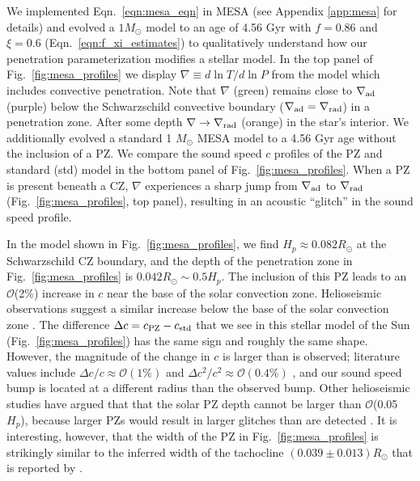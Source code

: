 \documentclass[twocolumn]{aastex631}
\newcommand{\gradrad}{\ensuremath{\nabla_{\rm{rad}}}}
\newcommand{\gradad}{\ensuremath{\nabla_{\rm{ad}}}}
\newcommand{\justgrad}{\ensuremath{\nabla}}
\begin{document}
We implemented Eqn.~\ref{eqn:mesa_eqn} in MESA (see Appendix \ref{app:mesa} for details) and evolved a $1 M_\odot$ model to an age of 4.56 Gyr with $f = 0.86$ and $\xi = 0.6$ (Eqn.~\ref{eqn:f_xi_estimates}) to qualitatively understand how our penetration parameterization modifies a stellar model.
In the top panel of Fig.~\ref{fig:mesa_profiles} we display $\justgrad \equiv d\ln T/d\ln P$ from the model which includes convective penetration.
Note that $\justgrad$ (green) remains close to $\gradad$ (purple) below the Schwarzschild convective boundary ($\gradad = \gradrad$) in a penetration zone.
After some depth $\justgrad \rightarrow \gradrad$ (orange) in the star's interior.
We additionally evolved a standard 1 $M_\odot$ MESA model to a 4.56 Gyr age without the inclusion of a PZ.
We compare the sound speed $c$ profiles of the PZ and standard (std) model in the bottom panel of Fig.~\ref{fig:mesa_profiles}.
When a PZ is present beneath a CZ, $\justgrad$ experiences a sharp jump from $\gradad$ to $\gradrad$ (Fig.~\ref{fig:mesa_profiles}, top panel), resulting in an acoustic ``glitch'' in the sound speed profile.

In the model shown in Fig.~\ref{fig:mesa_profiles}, we find $H_p \approx 0.082R_\odot$ at the Schwarzschild CZ boundary, and the depth of the penetration zone in Fig.~\ref{fig:mesa_profiles} is $0.042R_\odot \sim 0.5 H_p$.
The inclusion of this PZ leads to an $\mathcal{O}$(2\%) increase in $c$ near the base of the solar convection zone.
Helioseismic observations suggest a similar increase below the base of the solar convection zone \citep[e.g.,][their Fig. 17]{christensen-dalsgaard_etal_2011}.
The difference $\Delta c = c_{\rm{PZ}} - c_{\rm{std}}$ that we see in this stellar model of the Sun (Fig.~\ref{fig:mesa_profiles}) has the same sign and roughly the same shape.
However, the magnitude of the change in $c$ is larger than is observed; literature values include $\Delta c / c \approx \mathcal{O}(1\%)$ \citep{bergemann_serenelli_2014} and $\Delta c^2 / c^2 \approx \mathcal{O}(0.4\%)$ \citep{christensen-dalsgaard_etal_2011}, and our sound speed bump is located at a different radius than the observed bump.
Other helioseismic studies have argued that that the solar PZ depth cannot be larger than $\mathcal{O}$(0.05 $H_p$), because larger PZs would result in larger glitches than are detected  \citep[see Sct.~7.2.1 of][for a nice review]{basu2016}.
It is interesting, however, that the width of the PZ in Fig.~\ref{fig:mesa_profiles} is strikingly similar to the inferred width of the tachocline $(0.039 \pm 0.013)R_\odot$ that is reported by \citet{charbonneau_etal_1999}.
\end{document}

